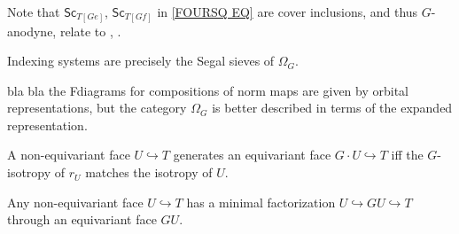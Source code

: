 \documentclass[a4paper,10pt,draft]{article}%
\numberwithin{equation}{section}%
\numberwithin{figure}{section}
\begin{document}
\begin{remark}
	Note that $\mathsf{Sc}_{T[Ge]}$, $\mathsf{Sc}_{T[Gf]}$
	in \eqref{FOURSQ EQ}
	are cover inclusions, and thus $G$-anodyne, relate to 
	\cite[\S 6.2]{Rez10}, \cite[\S 10]{Rez01}.
\end{remark}


\begin{remark}
Indexing systems are precisely the Segal sieves of $\Omega_G$.
\end{remark}

\begin{remark}
{\color{blue} bla bla} the Fdiagrams for compositions of norm maps are given by orbital representations, but the category $\Omega_G$ is better described in terms of the expanded representation.
\end{remark}




\begin{lemma}
	A non-equivariant face $U \hookrightarrow T$ generates an equivariant face $G\cdot U \hookrightarrow T$ iff the $G$-isotropy of $r_U$ matches the isotropy of $U$.
\end{lemma}






\begin{proposition}
	Any non-equivariant face $U \hookrightarrow T$ has a minimal factorization
	$U \hookrightarrow GU \hookrightarrow T$
	through an equivariant face $GU$.
\end{proposition}
\end{document}
